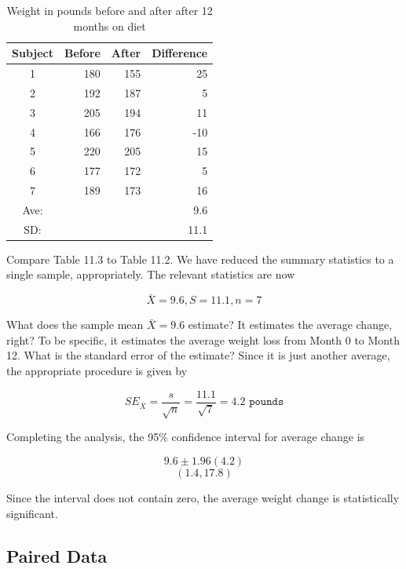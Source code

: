 \documentclass[11pt, chapterprefix=true]{scrbook}\usepackage[]{graphicx}\usepackage[]{color}
\begin{document}
\begin{table}[ht]
\centering
\caption{Weight in pounds before and after after 12 months on diet}
\begin{tabular}{@{} crrr @{}} \hline
Subject & Before & After & Difference \\ \hline
1 & 180 & 155 & 25 \\
2 & 192 & 187 & 5 \\
3 & 205 & 194 & 11 \\
4 & 166 & 176 & -10 \\
5 & 220 & 205 & 15 \\
6 & 177 & 172 & 5 \\
7 & 189 & 173 & 16 \\ \hline
Ave: &  &  & 9.6 \\
SD:  &  & & 11.1 \\ \hline
\end{tabular}
\end{table}

Compare Table 11.3 to Table 11.2.  We have reduced the summary statistics to a single sample, appropriately.  The relevant statistics are now

$$ \bar{X} = 9.6,  S = 11.1,  n= 7 $$

What does the sample mean $\bar{X} = 9.6$ estimate?  It estimates the average change, right?  To be specific, it estimates the average weight loss from Month 0 to Month 12.  What is the standard error of the estimate?  Since it is just another average, the appropriate procedure is given by 

\begin{equation*}
SE_{\bar{X}} = \frac{s}{\sqrt{n}} = \frac{11.1}{\sqrt{7}} = 4.2 \texttt{ pounds}
\end{equation*}

Completing the analysis, the 95\% confidence interval for average change is

\begin{equation*}
9.6 \pm 1.96 (4.2)
\end{equation*}
\begin{equation*}
(1.4, 17.8)
\end{equation*}

Since the interval does not contain zero, the average weight change is statistically significant.

\subsection{Paired Data}
\end{document}
